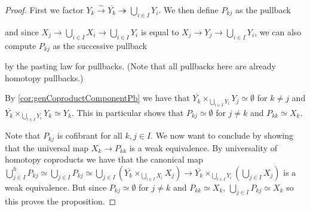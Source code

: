 \begin{corollary}
\begin{proof}
        First we factor $Y_k\xrightarrow{\sim}\overline{Y_k}\twoheadrightarrow\bigcup\limits_{i\in I}Y_i$.
        We then define $P_{kj}$ as the pullback
        \begin{center}
        \end{center}
        and since $X_j\to\bigcup\limits_{i\in I}X_i\to\bigcup\limits_{i\in I}Y_i$ is equal to $X_j\to Y_j\to\bigcup\limits_{i\in I}Y_i$, we can also compute $P_{kj}$ as the successive pullback
        \begin{center}%
        \end{center}
        by the pasting law for pullbacks.
        (Note that all pullbacks here are already homotopy pullbacks.)

        By \cref{cor:genCoproductComponentPb} we have that $\overline{Y_k}\times_{\bigcup\limits_{i\in I}Y_i} Y_j\simeq\emptyset$ for $k\neq j$ and $\overline{Y_k}\times_{\bigcup\limits_{i\in I}Y_i} Y_k\simeq Y_k$. %
        This in particular shows that $P_{kj}\simeq\emptyset$ for $j\neq k$ and $P_{kk}\simeq X_k$. %
        
        Note that $P_{kj}$ is cofibrant for all $k,j\in I$. 
        We now want to conclude by showing that the universal map $X_k\to P_{kk}$ is a weak equivalence.
        By universality of homotopy coproducts we have that the canonical map $\bigcup\limits_{j\in I}^hP_{kj}\simeq\bigcup\limits_{j\in I}P_{kj}\simeq\bigcup\limits_{j\in I} \left(\overline{Y_k}\times_{\bigcup\limits_{i\in I}X_i}X_j\right)\to\overline{Y_k}\times_{\bigcup\limits_{i\in I}Y_i}\left(\bigcup\limits_{j\in I}X_j\right)$ is a weak equivalence.
        But since $P_{kj}\simeq\emptyset$ for $j\neq k$ and $P_{kk}\simeq X_k$, $\bigcup\limits_{j\in I}P_{kj}\simeq X_k$ so this proves the proposition.
    \end{proof}
\end{corollary}
